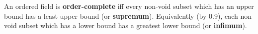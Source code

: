An ordered field is \textbf{order-complete} iff every non-void subset which has an upper bound has a least upper bound (or \textbf{supremum}). Equivalently (by 0.9), each non-void subset which has a lower bound has a greatest lower bound (or \textbf{infimum}).
